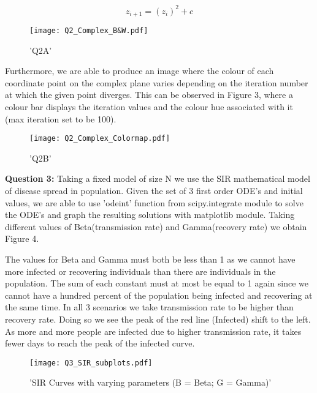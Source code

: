 \documentclass[12pt, a4paper]{article}
\begin{document}
\begin{equation}
\displaystyle
z_{i+1} = (z_i)^{2} + c
\end{equation}

\begin{figure}[htbp]
\texttt{[image: Q2\_Complex\_B\&W.pdf]}
\caption{'Q2A'}
\end{figure}

Furthermore, we are able to produce an image where the colour of each coordinate point on the complex plane varies depending on the iteration number at which the given point diverges. This can be observed in Figure 3, where a colour bar displays the iteration values and the colour hue associated with it (max iteration set to be 100).
\begin{figure}[htbp]
\texttt{[image: Q2\_Complex\_Colormap.pdf]}
\caption{'Q2B'}
\end{figure}
\newpage



\textbf{Question 3:}
Taking a fixed model of size N we use the SIR mathematical model of disease spread in population. Given the set of 3 first order ODE's and initial values, we are able to use 'odeint' function from scipy.integrate module to solve the ODE's and graph the resulting solutions with matplotlib module. Taking different values of Beta(transmission rate) and Gamma(recovery rate) we obtain Figure 4. 

The values for Beta and Gamma must both be less than 1 as we cannot have more infected or recovering individuals than there are individuals in the population. The sum of each constant must at most be equal to 1 again since we cannot have a hundred percent of the population being infected and recovering at the same time. In all 3 scenarios we take transmission rate to be higher than recovery rate. Doing so we see the peak of the red line (Infected)  shift to the left. As more and more people are infected due to higher transmission rate, it takes fewer days to reach the peak of the infected curve. 


\begin{figure}[htbp]
\texttt{[image: Q3\_SIR\_subplots.pdf]}
\caption{'SIR Curves with varying parameters (B = Beta; G = Gamma)'}
\end{figure}
\newpage
\end{document}
